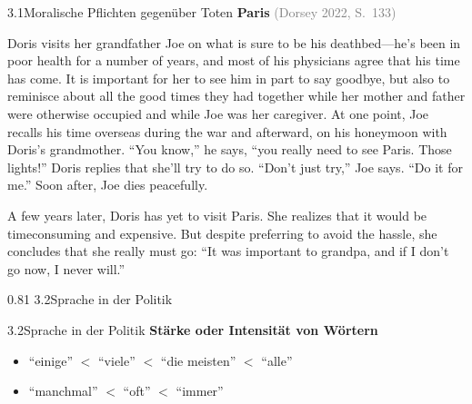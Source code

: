 \documentclass[xcolor=table,9pt,aspectratio=169]{beamer}
\begin{document}
\begin{frame}{\vspace*{10mm}3.1\hspace*{1em}Moralische Pflichten gegenüber Toten}
\textbf{Paris} \textcolor{gray}{(Dorsey 2022, S.~133)}

\smallskip
Doris visits her grandfather Joe on what is sure to be his deathbed---he's been in poor health for a number of years, and most of his physicians agree that his time has come.
It is important for her to see him in part to say goodbye, but also to reminisce about all the good times they had together while her mother and father were otherwise occupied and while Joe was her caregiver.
At one point, Joe recalls his time overseas during the war and afterward, on his honeymoon with Doris's grandmother.
\enquote{You know,} he says, \enquote{you really need to see Paris.
Those lights!}
Doris replies that she'll try to do so.
\enquote{Don't just try,} Joe says.
\enquote{Do it for me.}
Soon after, Joe dies peacefully.

\smallskip
A few years later, Doris has yet to visit Paris.
She realizes that it would be timeconsuming and expensive.
But despite preferring to avoid the hassle, she concludes that she really must go:
\enquote{It was important to grandpa, and if I don't go now, I never will.}
\end{frame}


\begin{frame}
\begin{overlayarea}{\textwidth}{0.81\paperheight}{
   \vspace*{11mm}
   \textcolor{uolblue}
   {3.2\hspace*{1em}Sprache in der Politik}
}
\end{overlayarea}
\end{frame}


\begin{frame}{\vspace*{10mm}3.2\hspace*{1em}Sprache in der Politik}
\textbf{Stärke oder Intensität von Wörtern}
\begin{itemize}
   \item \enquote{einige} $<$ \enquote{viele} $<$ \enquote{die meisten} $<$ \enquote{alle}
   \item \enquote{manchmal} $<$ \enquote{oft} $<$ \enquote{immer}
\end{itemize}
\end{frame}
\end{document}
